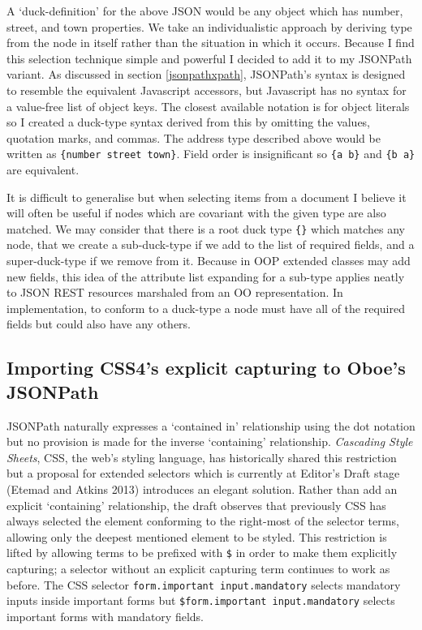 \documentclass[]{article}
\begin{document}
A `duck-definition' for the above JSON would be any object which has
number, street, and town properties. We take an individualistic approach
by deriving type from the node in itself rather than the situation in
which it occurs. Because I find this selection technique simple and
powerful I decided to add it to my JSONPath variant. As discussed in
section \ref{jsonpathxpath}, JSONPath's syntax is designed to resemble
the equivalent Javascript accessors, but Javascript has no syntax for a
value-free list of object keys. The closest available notation is for
object literals so I created a duck-type syntax derived from this by
omitting the values, quotation marks, and commas. The address type
described above would be written as \texttt{\{number street town\}}.
Field order is insignificant so \texttt{\{a b\}} and \texttt{\{b a\}}
are equivalent.

It is difficult to generalise but when selecting items from a document I
believe it will often be useful if nodes which are covariant with the
given type are also matched. We may consider that there is a root duck
type \texttt{\{\}} which matches any node, that we create a
sub-duck-type if we add to the list of required fields, and a
super-duck-type if we remove from it. Because in OOP extended classes
may add new fields, this idea of the attribute list expanding for a
sub-type applies neatly to JSON REST resources marshaled from an OO
representation. In implementation, to conform to a duck-type a node must
have all of the required fields but could also have any others.

\subsection{Importing CSS4's explicit capturing to Oboe's JSONPath}

JSONPath naturally expresses a `contained in' relationship using the dot
notation but no provision is made for the inverse `containing'
relationship. \emph{Cascading Style Sheets}, CSS, the web's styling
language, has historically shared this restriction but a proposal for
extended selectors which is currently at Editor's Draft stage (Etemad
and Atkins 2013) introduces an elegant solution. Rather than add an
explicit `containing' relationship, the draft observes that previously
CSS has always selected the element conforming to the right-most of the
selector terms, allowing only the deepest mentioned element to be
styled. This restriction is lifted by allowing terms to be prefixed with
\texttt{\$} in order to make them explicitly capturing; a selector
without an explicit capturing term continues to work as before. The CSS
selector \texttt{form.important input.mandatory} selects mandatory
inputs inside important forms but
\texttt{\$form.important input.mandatory} selects important forms with
mandatory fields.
\end{document}
